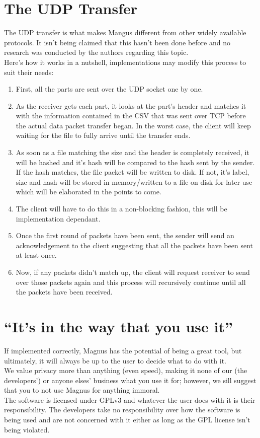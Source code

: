 \documentclass{article}
\begin{document}
\section{The UDP Transfer}
The UDP transfer is what makes Mangus different from other widely available
protocols. It isn't being claimed that this hasn't been done before and no
research was conducted by the authors regarding this topic. \\

Here's how it works in a nutshell, implementations may modify this process to
suit their needs:
\begin{enumerate}
      \item First, all the parts are sent over the UDP socket one by one.
      \item As the receiver gets each part, it looks at the part's header and matches it
            with the information contained in the CSV that was sent over TCP before the
            actual data packet transfer began. In the worst case, the client will keep
            waiting for the file to fully arrive until the transfer ends.
      \item As soon as a file matching the size and the header is completely received, it
            will be hashed and it's hash will be compared to the hash sent by the sender.
            If the hash matches, the file packet will be written to disk. If not, it's
            label, size and hash will be stored in memory/written to a file on disk for
            later use which will be elaborated in the points to come.
      \item The client will have to do this in a non-blocking fashion, this will be
            implementation dependant.
      \item Once the first round of packets have been sent, the sender will send an
            acknowledgement to the client suggesting that all the packets have been sent at
            least once.
      \item Now, if any packets didn't match up, the client will request receiver to send
            over those packets again and this process will recursively continue until all
            the packets have been received.
\end{enumerate}

\section{``It's in the way that you use it''}
If implemented correctly, Magnus has the potential of being a great tool, but
ultimately, it will always be up to the user to decide what to do with it. \\

We value privacy more than anything (even speed), making it none of our (the
developers') or anyone elses' business what you use it for; however, we sill
suggest that you to not use Magnus for anything immoral. \\

The software is licensed under GPLv3 and whatever the user does with it is
their responsibility. The developers take no responsibility over how the
software is being used and are not concerned with it either as long as the GPL
license isn't being violated.
\end{document}
